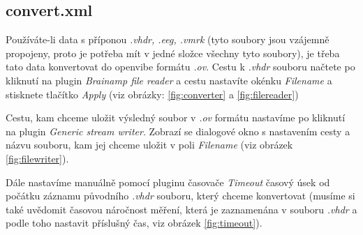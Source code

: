 \documentclass{report}
\begin{document}
\subsection{convert.xml}
 Používáte-li data s příponou \textit{.vhdr, .eeg, .vmrk} (tyto soubory jsou vzájemně propojeny, proto je potřeba mít v jedné složce všechny tyto soubory), je třeba tato data konvertovat do openvibe formátu \textit{.ov}. Cestu k \textit{.vhdr} souboru načtete po kliknutí na plugin \textit{Brainamp file reader} a cestu nastavíte okénku \textit{Filename} a stisknete tlačítko \textit{Apply} (viz obrázky: \ref{fig:converter} a \ref{fig:filereader})
 
 Cestu, kam chceme uložit výsledný soubor v \textit{.ov} formátu nastavíme po kliknutí na plugin \textit{Generic stream writer}. Zobrazí se dialogové okno s nastavením cesty a názvu souboru, kam jej chceme uložit v poli \textit{Filename} (viz obrázek \ref{fig:filewriter}). 

 Dále nastavíme manuálně pomocí pluginu časovače \textit{Timeout} časový úsek od počátku záznamu původního \textit{.vhdr} souboru, který chceme konvertovat (musíme si také uvědomit časovou náročnost měření, která je zaznamenána v souboru \textit{.vhdr} a podle toho nastavit příslušný čas, viz obrázek \ref{fig:timeout}).
 
\end{document}
